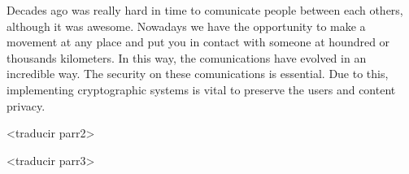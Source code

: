 \documentclass[../PFC.tex]{subfiles}
\begin{document}

Decades ago was really hard in time to comunicate people between each others, although it was awesome. Nowadays we have the opportunity to make a movement at any place and put you in contact with someone at houndred or thousands kilometers. In this way, the comunications have evolved in an incredible way. The security on these comunications is essential. Due to this, implementing cryptographic systems is vital to preserve the users and content privacy.

<traducir parr2>

<traducir parr3>


\end{document}
